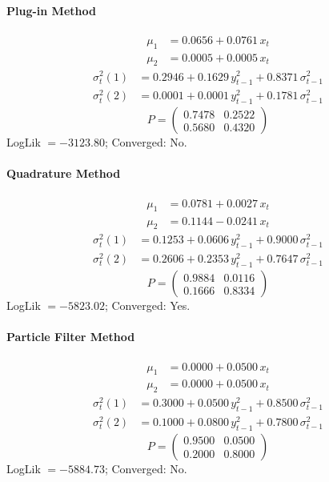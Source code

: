 \documentclass[11pt, a4paper]{article}
\begin{document}
\paragraph{Plug-in Method}
\begin{align}
\mu_{1} &= 0.0656 + 0.0761\, x_t \\
\mu_{2} &= 0.0005 + 0.0005\, x_t
\end{align}
\begin{align}
\sigma^2_{t}(1) &= 0.2946 + 0.1629\, y_{t-1}^2 + 0.8371\, \sigma^2_{t-1} \\
\sigma^2_{t}(2) &= 0.0001 + 0.0001\, y_{t-1}^2 + 0.1781\, \sigma^2_{t-1}
\end{align}
\begin{equation}
P = \begin{pmatrix} 0.7478 & 0.2522 \\ 0.5680 & 0.4320 \end{pmatrix}
\end{equation}
LogLik $= -3123.80$; Converged: No.

\paragraph{Quadrature Method}
\begin{align}
\mu_{1} &= 0.0781 + 0.0027\, x_t \\
\mu_{2} &= 0.1144 -0.0241\, x_t
\end{align}
\begin{align}
\sigma^2_{t}(1) &= 0.1253 + 0.0606\, y_{t-1}^2 + 0.9000\, \sigma^2_{t-1} \\
\sigma^2_{t}(2) &= 0.2606 + 0.2353\, y_{t-1}^2 + 0.7647\, \sigma^2_{t-1}
\end{align}
\begin{equation}
P = \begin{pmatrix} 0.9884 & 0.0116 \\ 0.1666 & 0.8334 \end{pmatrix}
\end{equation}
LogLik $= -5823.02$; Converged: Yes.

\paragraph{Particle Filter Method}
\begin{align}
\mu_{1} &= 0.0000 + 0.0500\, x_t \\
\mu_{2} &= 0.0000 + 0.0500\, x_t
\end{align}
\begin{align}
\sigma^2_{t}(1) &= 0.3000 + 0.0500\, y_{t-1}^2 + 0.8500\, \sigma^2_{t-1} \\
\sigma^2_{t}(2) &= 0.1000 + 0.0800\, y_{t-1}^2 + 0.7800\, \sigma^2_{t-1}
\end{align}
\begin{equation}
P = \begin{pmatrix} 0.9500 & 0.0500 \\ 0.2000 & 0.8000 \end{pmatrix}
\end{equation}
LogLik $= -5884.73$; Converged: No.
\end{document}
